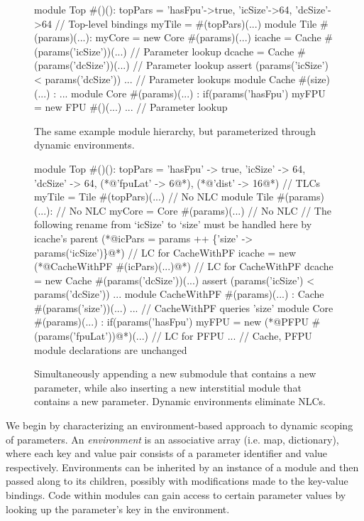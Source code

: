 \begin{figure}
\centering
\begin{phdl}
module Top #()():
  topPars = {'hasFpu'->true, 'icSize'->64, 'dcSize'->64} // Top-level bindings
  myTile = #(topPars)(...)
module Tile #(params)(...):
  myCore = new Core  #(params)(...)
  icache = Cache #(params('icSize'))(...)          // Parameter lookup
  dcache = Cache #(params('dcSize'))(...)          // Parameter lookup
  assert (params('icSize') < params('dcSize')) ... // Parameter lookups
module Cache #(size)(...) : ...
module Core  #(params)(...) :
  if(params('hasFpu') myFPU = new FPU #()(...) ... // Parameter lookup
\end{phdl} 
\caption{The same example module hierarchy, but parameterized through dynamic environments.}
\label{fig:env}
\end{figure}

\begin{figure}
\centering
\begin{phdl}
module Top #()():
  topPars = {'hasFpu' -> true, 'icSize' -> 64, 'dcSize' -> 64, (*@\textcolor[rgb]{0.8,0,0}{'fpuLat' -> 6}@*), (*@\textcolor[rgb]{1,0,0}{'dist' -> 16}@*) } // TLCs
  myTile = Tile #(topPars)(...)                                  // No NLC
module Tile #(params)(...):                                      // No NLC
  myCore = Core #(params)(...)                                   // No NLC
  // The following rename from `icSize' to `size' must be handled here by icache's parent
  (*@\textcolor[rgb]{1,0,0}{icPars = params ++ \{'size' -> params(`icSize')\}}@*)                // LC for CacheWithPF
  icache = new (*@\textcolor[rgb]{1,0,0}{CacheWithPF \#(icPars)(...)}@*)                        // LC for CacheWithPF
  dcache = new Cache #(params('dcSize'))(...)
  assert (params('icSize') < params('dcSize')) ...
module CacheWithPF #(params)(...) :
  Cache #(params('size'))(...) ... // CacheWithPF queries 'size'
module Core #(params)(...) :
   if(params('hasFpu') myFPU = new (*@\textcolor[rgb]{.8,0,0}{PFPU \#(params('fpuLat'))}@*)(...) // LC for PFPU
... // Cache, PFPU module declarations are unchanged
\end{phdl} 
\caption{Simultaneously appending a new submodule that contains a new parameter, while also inserting
a new interstitial module that contains a new parameter. Dynamic environments eliminate NLCs.}
\label{fig:env-delta}
\end{figure}

We begin by characterizing an environment-based approach to dynamic scoping of parameters.
An \emph{environment} is an associative array (i.e. map, dictionary), where each key and value pair consists of a parameter identifier and value respectively.
Environments can be inherited by an instance of a module and then passed along to its children, possibly
with modifications made to the key-value bindings.
Code within modules can gain access to certain parameter values by looking up the parameter's key in the environment.

